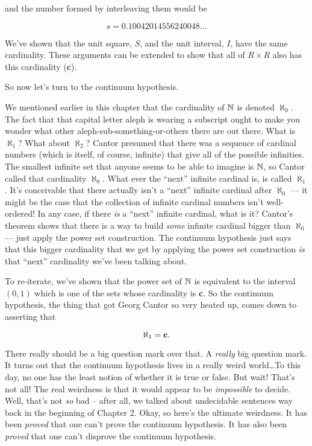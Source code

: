 \noindent and the number formed by interleaving them would be

\[ s = 0.10042014556240048 \ldots \]

We've shown that the unit square, $S$, and the unit interval, $I$, have the
same cardinality. These arguments can be extended to show that all of $R \times R$ also has this cardinality ({\bf c}).

So now let's turn to the continuum hypothesis.  

We mentioned earlier in this chapter that the cardinality of ${\mathbb N}$ is
denoted $\aleph_0$.  The fact that that capital letter aleph is wearing a 
subscript ought to make you wonder what other aleph-sub-something-or-others 
there are out there.   What is $\aleph_1$?  What about $\aleph_2$?  Cantor
presumed that there was a sequence of cardinal numbers (which is itself, of course, infinite) that give all of the possible infinities.  The smallest infinite set that anyone seems to be able to imagine is ${\mathbb N}$, so Cantor called 
that cardinality $\aleph_0$.  What ever the ``next'' infinite cardinal is, is
called $\aleph_1$.  It's conceivable that there actually isn't a ``next'' infinite cardinal after $\aleph_0$ --- it might be the case that the collection of 
infinite cardinal numbers isn't well-ordered!  In any case, if there \emph{is} a 
``next'' infinite cardinal, what is it?  Cantor's theorem shows that there is
a way to build \emph{some} infinite cardinal bigger than $\aleph_0$ --- just
apply the power set construction.  The continuum hypothesis just says that this 
bigger cardinality that we get by applying the power set construction \emph{is} that ``next'' cardinality we've been talking about.

To re-iterate, we've shown that the power set of ${\mathbb N}$ is equivalent
to the interval $(0,1)$ which is one of the sets whose cardinality is {\bf c}.
So the continuum hypothesis, the thing that got Georg Cantor so very heated up,
comes down to asserting that

\[ \aleph_1 = \mbox{{\bf c}}. \]

There really should be a big question mark over that.  A \emph{really} big
question mark.  It turns out that the continuum hypothesis lives in a really
weird world\ldots   To this day, no one has the least notion of whether it 
is true or false.  But wait!  That's not all!  The real weirdness is that it
would appear to be \emph{impossible} to decide.  Well, that's not \emph{so} bad -- after all, we talked about undecidable sentences way back in the beginning 
of Chapter 2.   Okay, so here's the ultimate weirdness.  It has been \emph{proved} that one can't prove the continuum hypothesis.  It has also been \emph{proved} that one can't disprove the continuum hypothesis.   

